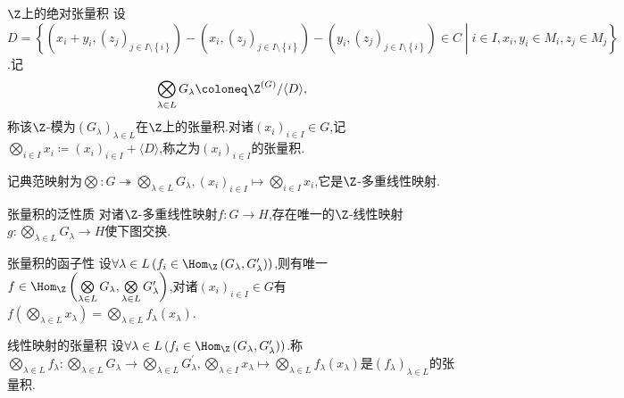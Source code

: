 \begin{definition}{$\Z$上的绝对张量积}{}
	设$D=\left\{\left(x_{i}+y_{i},\left(z_{j}\right)_{j\in I\setminus\left\{i\right\}}\right)-\left(x_{i},\left(z_{j}\right)_{j\in I\setminus\left\{i\right\}}\right)-\left(y_{i},\left(z_{j}\right)_{j\in I\setminus\left\{i\right\}}\right)\in C\middle|i\in I,x_{i},y_{i}\in M_{i},z_{j}\in M_{j}\right\}$.记
	\begin{align*}
		\bigotimes\limits_{\lambda\in L}G_{\lambda}\coloneq\Z^{\left(G\right)}/\langle D\rangle,
	\end{align*}
	称该$\Z$-模为$\left(G_{\lambda}\right)_{\lambda\in L}$在$\Z$上的张量积.对诸$\left(x_{i}\right)_{i\in I}\in G$,记$\bigotimes\limits_{i\in I}x_{i}\coloneq\left(x_{i}\right)_{i\in I}+\langle D\rangle$,称之为$\left(x_{i}\right)_{i\in I}$的张量积.
	
	记典范映射为$\bigotimes:G\twoheadrightarrow\bigotimes\limits_{\lambda\in L}G_{\lambda},\left(x_{i}\right)_{i\in I}\mapsto\bigotimes\limits_{i\in I}x_{i}$,它是$\Z$-多重线性映射.
\end{definition}

\begin{proposition}{张量积的泛性质}{}
	对诸$\Z$-多重线性映射$f:G\to H$,存在唯一的$\Z$-线性映射$g:\bigotimes\limits_{\lambda\in L}G_{\lambda}\to H$使下图交换.
	\begin{center}
	\end{center}
\end{proposition}

\begin{proposition}{张量积的函子性}{}
	设$\forall\lambda\in L\left(f_{i}\in\Hom_{\Z}\left(G_{\lambda},G_{\lambda}^{\prime}\right)\right)$,则有唯一$f\in\Hom_{\Z}\left(\bigotimes\limits_{\lambda\in L}G_{\lambda},\bigotimes\limits_{\lambda\in L}G_{\lambda}^{\prime}\right)$,对诸$\left(x_{i}\right)_{i\in I}\in G$有$f\left(\bigotimes\limits_{\lambda\in L}x_{\lambda}\right)=\bigotimes\limits_{\lambda\in L}f_{\lambda}\left(x_{\lambda}\right)$.
\end{proposition}

\begin{definition}{线性映射的张量积}{}
	设$\forall \lambda\in L\left(f_{i}\in\Hom_{\Z}\left(G_{\lambda},G_{\lambda}^{\prime}\right)\right)$.称$\bigotimes\limits_{\lambda\in L}f_{\lambda}:\bigotimes\limits_{\lambda\in L}G_{\lambda}\to\bigotimes\limits_{\lambda\in L}G_{\lambda}^{\prime},\bigotimes\limits_{\lambda\in I}x_{\lambda}\mapsto\bigotimes\limits_{\lambda\in L}f_{\lambda}\left(x_{\lambda}\right)$是$\left(f_{\lambda}\right)_{\lambda\in L}$的张量积.
\end{definition}

